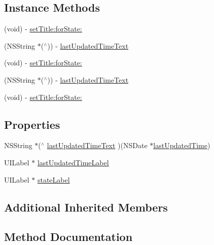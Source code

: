 \subsection*{Instance Methods}
\begin{DoxyCompactItemize}
\item 
(void) -\/ \mbox{\hyperlink{interface_m_j_refresh_state_header_a0c7a98e2c4fd7d8971525d17a8f7e519}{set\+Title\+:for\+State\+:}}
\item 
(N\+S\+String $\ast$($^\wedge$)) -\/ \mbox{\hyperlink{interface_m_j_refresh_state_header_aac71baeca3ab02f438f09eaa7bc3f705}{last\+Updated\+Time\+Text}}
\item 
(void) -\/ \mbox{\hyperlink{interface_m_j_refresh_state_header_a0c7a98e2c4fd7d8971525d17a8f7e519}{set\+Title\+:for\+State\+:}}
\item 
(N\+S\+String $\ast$($^\wedge$)) -\/ \mbox{\hyperlink{interface_m_j_refresh_state_header_aac71baeca3ab02f438f09eaa7bc3f705}{last\+Updated\+Time\+Text}}
\item 
(void) -\/ \mbox{\hyperlink{interface_m_j_refresh_state_header_a0c7a98e2c4fd7d8971525d17a8f7e519}{set\+Title\+:for\+State\+:}}
\end{DoxyCompactItemize}
\subsection*{Properties}
\begin{DoxyCompactItemize}
\item 
N\+S\+String $\ast$($^\wedge$ \mbox{\hyperlink{interface_m_j_refresh_state_header_adcc7f1db9e3dfe287d52dc71af3e2ad1}{last\+Updated\+Time\+Text}} )(N\+S\+Date $\ast$\mbox{\hyperlink{interface_m_j_refresh_header_ad673d647b3f6bbb11230437a7e739c3a}{last\+Updated\+Time}})
\item 
U\+I\+Label $\ast$ \mbox{\hyperlink{interface_m_j_refresh_state_header_a7b9da0a5031c4cb6786e9c4adf6eded9}{last\+Updated\+Time\+Label}}
\item 
U\+I\+Label $\ast$ \mbox{\hyperlink{interface_m_j_refresh_state_header_a8b6b4132d5bd1f0f197766ff0b6eb883}{state\+Label}}
\end{DoxyCompactItemize}
\subsection*{Additional Inherited Members}


\subsection{Method Documentation}
\mbox{\label{interface_m_j_refresh_state_header_aac71baeca3ab02f438f09eaa7bc3f705}} 
